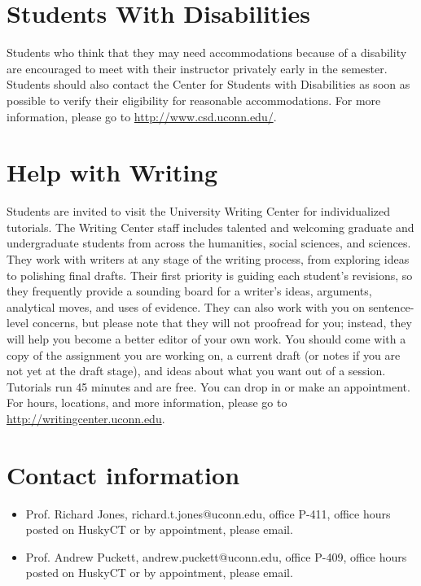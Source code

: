 \documentclass{revtex4}
\begin{document}
\section{Students With Disabilities}
Students who think that they may need accommodations because of a disability
are encouraged to meet with their instructor privately early in the semester.
Students should also contact the Center for Students with Disabilities as
soon as possible to verify their eligibility for reasonable accommodations.
For more information, please go to \url{http://www.csd.uconn.edu/}.

\section{Help with Writing}
Students are invited to visit the University Writing Center for individualized
tutorials. The Writing Center staff includes talented and welcoming graduate
and undergraduate students from across the humanities, social sciences, and
sciences. They work with writers at any stage of the writing process, from
exploring ideas to polishing final drafts. Their first priority is guiding 
each student's revisions, so they frequently provide a sounding board for a
writer's ideas, arguments, analytical moves, and uses of evidence. They can
also work with you on sentence-level concerns, but please note that they will
not proofread for you; instead, they will help you become a better editor of
your own work. You should come with a copy of the assignment you are working 
on, a current draft (or notes if you are not yet at the draft stage), and
ideas about what you want out of a session. Tutorials run 45 minutes and are
free. You can drop in or make an appointment. For hours, locations, and more
information, please go to \url{http://writingcenter.uconn.edu}.

\section{Contact information}
\begin{itemize}
\item
Prof. Richard Jones, richard.t.jones@uconn.edu, office P-411, office hours
posted on HuskyCT or by appointment, please email.
\item
Prof. Andrew Puckett, andrew.puckett@uconn.edu, office P-409, office hours
posted on HuskyCT or by appointment, please email.
\end{itemize}
\end{document}
